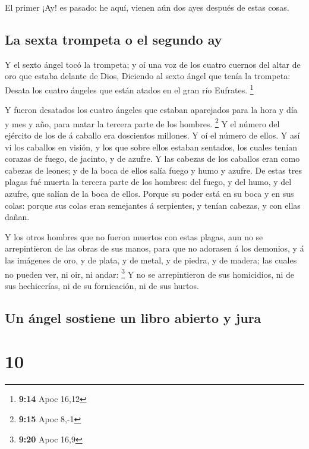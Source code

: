  El primer ¡Ay! es pasado: he aquí, vienen aún dos ayes
después de estas cosas.

\hypertarget{la-sexta-trompeta-o-el-segundo-ay}{%
\subsection{La sexta trompeta o el segundo
ay}\label{la-sexta-trompeta-o-el-segundo-ay}}

 Y el sexto ángel tocó la trompeta; y oí una voz de los
cuatro cuernos del altar de oro que estaba delante de Dios,
 Diciendo al sexto ángel que tenía la trompeta: Desata
los cuatro ángeles que están atados en el gran río Eufrates. \footnote{\textbf{9:14}
  Apoc 16,12}

 Y fueron desatados los cuatro ángeles que estaban
aparejados para la hora y día y mes y año, para matar la tercera parte
de los hombres. \footnote{\textbf{9:15} Apoc 8,-1}  Y el
número del ejército de los de á caballo era doscientos millones. Y oí el
número de ellos.  Y así vi los caballos en visión, y los
que sobre ellos estaban sentados, los cuales tenían corazas de fuego, de
jacinto, y de azufre. Y las cabezas de los caballos eran como cabezas de
leones; y de la boca de ellos salía fuego y humo y azufre.
 De estas tres plagas fué muerta la tercera parte de los
hombres: del fuego, y del humo, y del azufre, que salían de la boca de
ellos.  Porque su poder está en su boca y en sus colas:
porque sus colas eran semejantes á serpientes, y tenían cabezas, y con
ellas dañan.

 Y los otros hombres que no fueron muertos con estas
plagas, aun no se arrepintieron de las obras de sus manos, para que no
adorasen á los demonios, y á las imágenes de oro, y de plata, y de
metal, y de piedra, y de madera; las cuales no pueden ver, ni oir, ni
andar: \footnote{\textbf{9:20} Apoc 16,9}  Y no se
arrepintieron de sus homicidios, ni de sus hechicerías, ni de su
fornicación, ni de sus hurtos.

\hypertarget{un-uxe1ngel-sostiene-un-libro-abierto-y-jura}{%
\subsection{Un ángel sostiene un libro abierto y
jura}\label{un-uxe1ngel-sostiene-un-libro-abierto-y-jura}}

\hypertarget{section-9}{%
\section{10}\label{section-9}}

